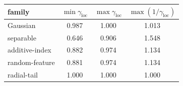 \begin{tabular}{lccc}
\toprule
family & $\min\gamma_{\mathrm{loc}}$ & $\max\gamma_{\mathrm{loc}}$ & $\max(1/\gamma_{\mathrm{loc}})$ \\
\midrule
Gaussian & 0.987 & 1.000 & 1.013 \\
separable & 0.646 & 0.906 & 1.548 \\
additive-index & 0.882 & 0.974 & 1.134 \\
random-feature & 0.881 & 0.974 & 1.134 \\
radial-tail & 1.000 & 1.000 & 1.000 \\
\bottomrule
\end{tabular}
